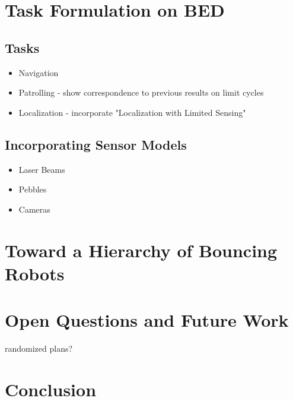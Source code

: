 \documentclass[letterpaper, 10 pt, conference]{ieeeconf}  %
\begin{document}
\section{Task Formulation on BED}

\subsection{Tasks}

\begin{itemize}
\item Navigation
\item Patrolling - show correspondence to previous results on limit cycles
\item Localization - incorporate "Localization with Limited Sensing"
\end{itemize}

\subsection{Incorporating Sensor Models}

\begin{itemize}
\item Laser Beams
\item Pebbles
\item Cameras
\end{itemize}


\section{Toward a Hierarchy of Bouncing Robots}




\section{Open Questions and Future Work}

randomized plans?

\section{Conclusion}





\end{document}
